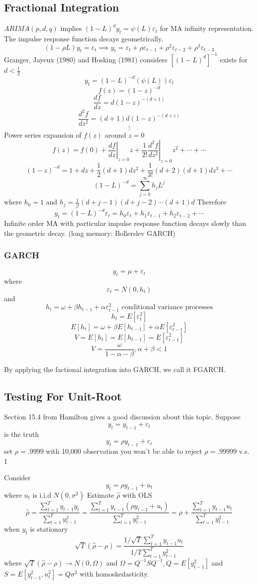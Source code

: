 \documentclass[11pt, a4paper, oneside]{article}
\theoremstyle{definition}
\theoremstyle{proposition}
\theoremstyle{corollary}
\theoremstyle{lemma}
\theoremstyle{theorem}
\begin{document}
\subsection{Fractional Integration}
$ARIMA(p, d, q)$ implies $(1-L)^dy_t = \psi(L)\varepsilon_t$ for MA infinity representation. The impulse response function decays geometrically. $$(1-\rho L)y_t = \varepsilon_t \implies y_t = \varepsilon_t +\rho \varepsilon_{t-1} + \rho^2 \varepsilon_{t -2} + \rho^3 \varepsilon_{t -3}$$
Granger, Jayeux (1980) and  Hosking (1981) considers $[(1-L)^d]^{-1}$ exists for $d <\frac{1}{2}$ 
$$y_t = (1- L)^{-d}(\psi(L)) \varepsilon_t$$
$$f(z) = (1- z)^{-d}$$
$$\frac{d f}{dz} = d(1-z)^{-(d+1)}$$
$$\frac{d^2 f}{dz^2} = (d+1)d(1-z)^{-(d+z)}$$
$$\vdots$$
Power series expansion of $f(z)$ around $z=0$ 
$$f(z) = f(0)+\left.\frac{d f}{dz}\right|_{z=0} z + \frac{1}{2!}\left.\frac{d^2 f}{dz^2}\right|_{z=0} z^2 + \cdots + \cdots $$
$$(1- z)^{-d} = 1 + dz + \frac{1}{2}(d+1)dz^2 + \frac{1}{3!}(d+2)(d+1)d z^3 + \cdots$$
$$(1-L)^{-d} = \sum_{j=0}^{\infty} h_j L^j$$ where $h_0 = 1$ and $h_j = \frac{1}{j!}(d+j -1)(d+j -2)\cdots(d+1)d$
Therefore
$$y_t = (1-L)^{-d}\varepsilon_t = h_0 \varepsilon_t + h_1\varepsilon_{t-1} + h_2\varepsilon_{t -2}+\cdots$$
Infinite order MA with particular impulse response function decays slowly than the geometric decay. (long memory; Bollerslev GARCH)
\subsubsection{GARCH}
$$y_t = \mu + \varepsilon_t$$
where $$\varepsilon_t = N(0, h_t)$$ and $$h_t = \omega + \beta h_{t -1} + \alpha \varepsilon_{t-1}^2 \text{ conditional variance processes}$$
$$h_t = E[\varepsilon_t^2]$$
$$E[h_t] = \omega + \beta E[h_{t-1}] + \alpha E[\varepsilon_{t-1}^2]$$
$$V = E[h_t] = E[h_{t -1}] = E[\varepsilon_{t-1}^2]$$
$$V = \frac{\omega}{1- \alpha - \beta}, \alpha + \beta < 1$$

By applying the factional integration into GARCH, we call it FGARCH. 

\subsection{Testing For Unit-Root}
Section 15.4 from Hamilton gives a good discussion about this topic. Suppose
$$y_t = y_{t-1} + \varepsilon_t$$ is the truth 
$$y_t = \rho y_{t-1} + \varepsilon_t$$ set $\rho=.9999$ with 10,000 observation you won't be able to reject $\rho = .99999$ v.s. 1

Consider 
$$y_t = \rho y_{t-1} + u_t$$ where $u_t$ is i.i.d $N(0, \sigma^2)$
Estimate $\hat{\rho}$ with OLS
$$\hat{\rho} = \frac{\sum_{t=1}^T y_{t-1}y_t}{\sum_{t=1}^T y_{t-1}^2} = \frac{\sum_{t=1}^T y_{t-1}(\rho y_{t-1} + u_t)}{\sum_{t =1}^T y_{t-1}^2} = \rho + \frac{\sum_{t =1}^T y_{t-1} u_t}{\sum_{t=1}^T y_{t-1}^2}$$
when $y_t$ is stationary
$$\sqrt{T}(\hat{\rho} - \rho) = \frac{1/\sqrt{T}\sum_{t=1}^T y_{t-1}u_t}{1/T\sum_{t=1}^Ty_{t-1}^2}$$
where $\sqrt{T}(\hat{\rho} - \rho) \to N(0, \Omega)$ and $\Omega = Q^{-1}SQ^{-1}, Q= E[y_{t-1}^2]$ and $S = E[y_{t-1}^2, u_t^2] = Q\sigma^2$ with homoskedasticity. 
\end{document}
